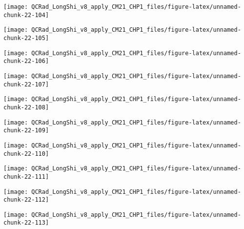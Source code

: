 \documentclass[
  10pt,
  a4paper,oneside]{article}
\begin{document}
\begin{center}\texttt{[image: QCRad\_LongShi\_v8\_apply\_CM21\_CHP1\_files/figure-latex/unnamed-chunk-22-104]} \end{center}

\begin{center}\texttt{[image: QCRad\_LongShi\_v8\_apply\_CM21\_CHP1\_files/figure-latex/unnamed-chunk-22-105]} \end{center}

\begin{center}\texttt{[image: QCRad\_LongShi\_v8\_apply\_CM21\_CHP1\_files/figure-latex/unnamed-chunk-22-106]} \end{center}

\begin{center}\texttt{[image: QCRad\_LongShi\_v8\_apply\_CM21\_CHP1\_files/figure-latex/unnamed-chunk-22-107]} \end{center}

\begin{center}\texttt{[image: QCRad\_LongShi\_v8\_apply\_CM21\_CHP1\_files/figure-latex/unnamed-chunk-22-108]} \end{center}

\begin{center}\texttt{[image: QCRad\_LongShi\_v8\_apply\_CM21\_CHP1\_files/figure-latex/unnamed-chunk-22-109]} \end{center}

\begin{center}\texttt{[image: QCRad\_LongShi\_v8\_apply\_CM21\_CHP1\_files/figure-latex/unnamed-chunk-22-110]} \end{center}

\begin{center}\texttt{[image: QCRad\_LongShi\_v8\_apply\_CM21\_CHP1\_files/figure-latex/unnamed-chunk-22-111]} \end{center}

\begin{center}\texttt{[image: QCRad\_LongShi\_v8\_apply\_CM21\_CHP1\_files/figure-latex/unnamed-chunk-22-112]} \end{center}

\begin{center}\texttt{[image: QCRad\_LongShi\_v8\_apply\_CM21\_CHP1\_files/figure-latex/unnamed-chunk-22-113]} \end{center}
\end{document}
